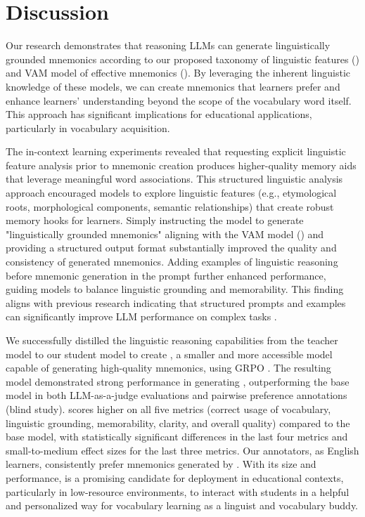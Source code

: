 \section{Discussion} \label{sec:discussion}

Our research demonstrates that reasoning LLMs can generate linguistically grounded mnemonics according to our proposed taxonomy of linguistic features () and VAM model of effective mnemonics (). By leveraging the inherent linguistic knowledge of these models, we can create mnemonics that learners prefer and enhance learners' understanding beyond the scope of the vocabulary word itself. This approach has significant implications for educational applications, particularly in vocabulary acquisition.

The in-context learning experiments revealed that requesting explicit linguistic feature analysis prior to mnemonic creation produces higher-quality memory aids that leverage meaningful word associations. This structured linguistic analysis approach encouraged models to explore linguistic features (e.g., etymological roots, morphological components, semantic relationships) that create robust memory hooks for learners. Simply instructing the model to generate "linguistically grounded mnemonics" aligning with the VAM model () and providing a structured output format substantially improved the quality and consistency of generated mnemonics. Adding examples of linguistic reasoning before mnemonic generation in the prompt further enhanced performance, guiding models to balance linguistic grounding and memorability. This finding aligns with previous research indicating that structured prompts and examples can significantly improve LLM performance on complex tasks \citep{brownFewShotLearners2020,yinDidYouRead2023}.

We successfully distilled the linguistic reasoning capabilities from the teacher model \teachermodel to our student model \studentmodel to create \linksys, a smaller and more accessible model capable of generating high-quality mnemonics, using GRPO \citep{DeepSeek-AIDEEPSEEKR12025}. The resulting \linksys model demonstrated strong performance in generating \lgms, outperforming the base model in both LLM-as-a-judge evaluations and pairwise preference annotations (blind study). \linksys scores higher on all five metrics (correct usage of vocabulary, linguistic grounding, memorability, clarity, and overall quality) compared to the base model, with statistically significant differences in the last four metrics and small-to-medium effect sizes for the last three metrics. Our annotators, as English learners, consistently prefer mnemonics generated by \linksys. With its size and performance, \linksys is a promising candidate for deployment in educational contexts, particularly in low-resource environments, to interact with students in a helpful and personalized way for vocabulary learning as a linguist and vocabulary buddy.

